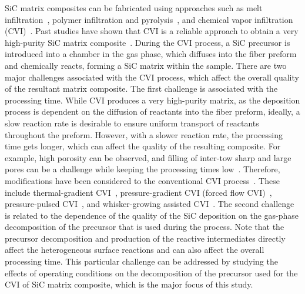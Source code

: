 \documentclass[final, letterpaper, square, comma, numbers, sort&compress]{elsarticle}
\begin{document}
SiC matrix composites can be fabricated using approaches such as melt infiltration~\cite{Xu1999,DiCarlo2005}, polymer infiltration and pyrolysis~\cite{Sirieix1990, Kohyama2000}, and chemical vapor infiltration (CVI)~\cite{Sayano1999,Lamon2005,Deck2013}. Past studies have shown that CVI is a reliable approach to obtain a very high-purity SiC matrix composite~\cite{Lamon2005,Katoh2014}. During the CVI process, a SiC precursor is introduced into a chamber in the gas phase, which diffuses into the fiber preform and chemically reacts, forming a SiC matrix within the sample. There are two major challenges associated with the CVI process, which affect the overall quality of the resultant matrix composite. The first challenge is associated with the processing time. While CVI produces a very high-purity matrix, as the deposition process is dependent on the diffusion of reactants into the fiber preform, ideally, a slow reaction rate is desirable to ensure uniform transport of reactants throughout the preform. However, with a slower reaction rate, the processing time gets longer, which can affect the quality of the resulting composite. For example, high porosity can be observed, and filling of inter-tow sharp and large pores can be a challenge while keeping the processing times low~\cite{Liu2021}. Therefore, modifications have been considered to the conventional CVI process~\cite{Lamon2005,Probst1999}. These include thermal-gradient CVI~\cite{Stinton1986}, pressure-gradient CVI (forced flow CVI)~\cite{Deck2013}, pressure-pulsed CVI~\cite{Naslain2001}, and whisker-growing assisted CVI~\cite{Oh2001}. The second challenge is related to the dependence of the quality of the SiC deposition on the gas-phase decomposition of the precursor that is used during the process. Note that the precursor decomposition and production of the reactive intermediates directly affect the heterogeneous surface reactions and can also affect the overall processing time. This particular challenge can be addressed by studying the effects of operating conditions on the decomposition of the precursor used for the CVI of SiC matrix composite, which is the major focus of this study.
\end{document}
